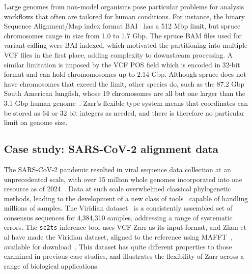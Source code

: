 \documentclass[a4paper,num-refs]{oup-contemporary}
\begin{document}
Large genomes from non-model organisms pose particular problems for
analysis workflows that often are tailored for human conditions. For
instance, the binary Sequence Alignment/Map index format
BAI~\cite{li2009sequence} has a 512
Mbp limit, but spruce chromosomes range in size from 1.0 to 1.7 Gbp.
The spruce BAM files used for variant calling were BAI indexed, which
motivated the partitioning into multiple VCF files in the first place,
adding complexity to downstream processing.
A similar limitation is imposed by the VCF POS field which is encoded
in 32-bit format and can hold chromomosomes up to 2.14 Gbp. Although
spruce does not have chromosomes that exceed the limit, other species
do, such as the 87.2 Gbp South American lungfish, whose 19 chromosomes
are all but one larger than the 3.1 Gbp human
genome~\cite{schartl_GenomesAllLungfish_2024}. Zarr's flexible type
system means that coordinates can be stored as 64 or 32 bit integers
as needed, and there is therefore no particular limit on genome size.

\subsection{Case study: SARS-CoV-2 alignment data}
The SARS-CoV-2 pandemic resulted in viral sequence data collection at
an unprecedented scale, with over 15 million whole genomes incorporated into
one resource as of 2024~\citep{hinrichs2024ongoing}. Data at such scale
overwhelmed classical phylogenetic methods, leading to the development
of a new class of tools~\citep{turakhia2021ultrafast,ye2022matoptimize,zhan2023towards}
capable of handling millions of samples.
The Viridian dataset~\citep{hunt2024addressing} is a consistently assembled
set of consensus sequences for 4,384,310 samples, addressing a range of systematic
errors. The \texttt{sc2ts} inference tool uses VCF-Zarr as its
input format, and Zhan et al have made the Viridian dataset,
aligned to the reference using MAFFT~\citep{katoh2013mafft},
available for download~\citep{zhan2023towards}. This dataset has quite
different properties to those examined in previous case studies, and
illustrates the flexibility of Zarr across a range of biological applications.
\end{document}
